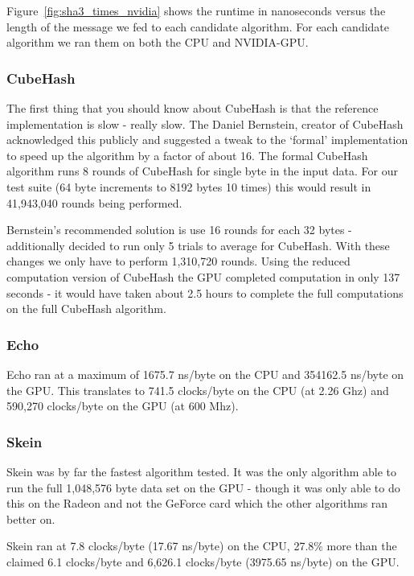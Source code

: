 Figure~\ref{fig:sha3_times_nvidia} shows the runtime in nanoseconds versus the length of the message we fed to each candidate algorithm. For each candidate algorithm we ran them on both the CPU and NVIDIA-GPU.

\subsubsection*{CubeHash}
The first thing that you should know about CubeHash is that the reference implementation is  slow - really slow.
The Daniel Bernstein, creator of CubeHash acknowledged this publicly\cite{Bernstein} and suggested a tweak to the `formal' implementation to speed up the algorithm by a factor of about 16.
The formal CubeHash algorithm runs 8 rounds of CubeHash for single byte in the input data. For our test suite (64 byte increments to 8192 bytes 10 times) this would result in 41,943,040 rounds being performed.

Bernstein's recommended solution is use 16 rounds for each 32 bytes - additionally decided to run only 5 trials to average for CubeHash.
With these changes we only have to perform 1,310,720 rounds.
Using the reduced computation version of CubeHash the GPU completed computation in only 137 seconds - it would have taken about 2.5 hours to complete the full computations on the full CubeHash algorithm.

\subsubsection*{Echo}
Echo ran at a maximum of 1675.7 ns/byte on the CPU and 354162.5 ns/byte on the GPU.
This translates to 741.5 clocks/byte on the CPU (at 2.26 Ghz) and 590,270 clocks/byte on the GPU (at 600 Mhz).

\subsubsection*{Skein}
Skein was by far the fastest algorithm tested.
It was the only algorithm able to run the full 1,048,576 byte data set on the GPU - though it was only able to do this on the Radeon and not the GeForce card which the other algorithms ran better on.

Skein ran at 7.8 clocks/byte (17.67 ns/byte) on the CPU, 27.8\% more than the claimed 6.1 clocks/byte and 6,626.1 clocks/byte (3975.65 ns/byte) on the GPU.